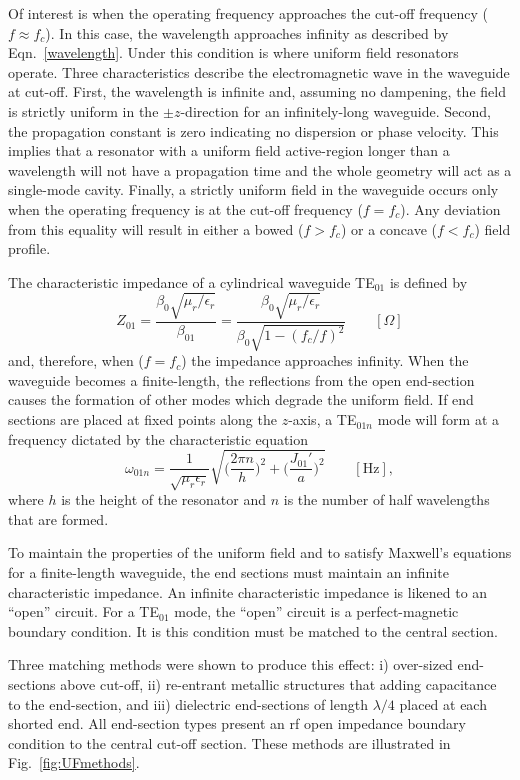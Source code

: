 Of interest is when the operating frequency approaches the cut-off frequency ($f \approx f_c$). In this case, the wavelength approaches infinity as described by Eqn.~\ref{wavelength}. Under this condition is where uniform field resonators operate. Three characteristics describe the electromagnetic wave in the waveguide at cut-off. First, the wavelength is infinite and, assuming no dampening, the field is strictly uniform in the $\pm z$-direction for an infinitely-long waveguide. Second, the propagation constant is zero indicating no dispersion or phase velocity. This implies that a resonator with a uniform field active-region longer than a wavelength will not have a propagation time and the whole geometry will act as a single-mode cavity.  Finally, a strictly uniform field in the waveguide occurs only when the operating frequency is at the cut-off frequency ($f=f_c$). Any deviation from this equality will result in either a bowed ($f>f_c$) or a concave ($f<f_c$) field profile.

The characteristic impedance of a cylindrical waveguide TE$_{01}$ is defined by 
\begin{equation}
    Z_{01} = \frac{\beta_0 \sqrt{\mu_r/ \epsilon_r}}{\beta_{01}} =\frac{\beta_0 \sqrt{\mu_r/ \epsilon_r}}{\beta_0 \sqrt{1-(f_c/f)^2}} \qquad [\Omega]
\end{equation}
and, therefore, when ($f=f_c$) the impedance approaches infinity. When the waveguide becomes a finite-length, the reflections from the open end-section causes the formation of other modes which degrade the uniform field. If end sections are placed at fixed points along the $z$-axis, a TE$_{01n}$ mode will form at a frequency dictated by the characteristic equation
\begin{equation}
    \omega_{01n} = \frac{1}{\sqrt{\mu_r \epsilon_r}}\sqrt{\bigg(\frac{2 \pi n}{h}\bigg)^2+\bigg(\frac{J_{01}'}{a}\bigg)^2} \qquad [\text{Hz}],
\end{equation}
where $h$ is the height of the resonator and $n$ is the number of half wavelengths that are formed.

To maintain the properties of the uniform field and to satisfy Maxwell's equations for a finite-length waveguide, the end sections must maintain an infinite characteristic impedance. An infinite characteristic impedance is likened to an ``open'' circuit. For a TE$_{01}$ mode, the ``open'' circuit is a perfect-magnetic boundary condition. It is this condition must be matched to the central section. 

Three matching methods were shown to produce this effect: i) over-sized end-sections above cut-off, ii) re-entrant metallic structures that adding capacitance to the end-section, and iii) dielectric end-sections of length $\lambda/4$ placed at each shorted end. All end-section types present an rf open impedance boundary condition to the central cut-off section. These methods are illustrated in Fig.~\ref{fig:UFmethods}.

